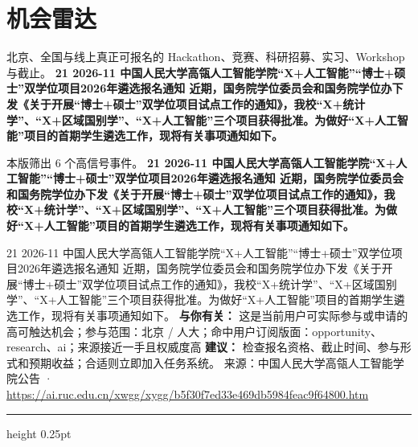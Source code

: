 \documentclass[10.5pt]{ctexart}
\begin{document}
\section*{机会雷达}
{\color{ormuted} 北京、全国与线上真正可报名的 Hackathon、竞赛、科研招募、实习、Workshop 与截止。}
\vspace{2mm}
{\LARGE\bfseries 21 2026-11 中国人民大学高瓴人工智能学院“X+人工智能”“博士+硕士”双学位项目2026年遴选报名通知 近期，国务院学位委员会和国务院学位办下发《关于开展“博士+硕士”双学位项目试点工作的通知》，我校“X+统计学”、“X+区域国别学”、“X+人工智能”三个项目获得批准。为做好“X+人工智能”项目的首期学生遴选工作，现将有关事项通知如下。}\par
\vspace{1mm}
{\color{ormuted} 本版筛出 6 个高信号事件。}
\vspace{3mm}
{\Large\bfseries 21 2026-11 中国人民大学高瓴人工智能学院“X+人工智能”“博士+硕士”双学位项目2026年遴选报名通知 近期，国务院学位委员会和国务院学位办下发《关于开展“博士+硕士”双学位项目试点工作的通知》，我校“X+统计学”、“X+区域国别学”、“X+人工智能”三个项目获得批准。为做好“X+人工智能”项目的首期学生遴选工作，现将有关事项通知如下。}\par
21 2026-11 中国人民大学高瓴人工智能学院“X+人工智能”“博士+硕士”双学位项目2026年遴选报名通知 近期，国务院学位委员会和国务院学位办下发《关于开展“博士+硕士”双学位项目试点工作的通知》，我校“X+统计学”、“X+区域国别学”、“X+人工智能”三个项目获得批准。为做好“X+人工智能”项目的首期学生遴选工作，现将有关事项通知如下。
\textbf{与你有关：} 这是当前用户可实际参与或申请的高可触达机会；参与范围：北京 / 人大；命中用户订阅版面：opportunity、research、ai；来源接近一手且权威度高
\textbf{建议：} 检查报名资格、截止时间、参与形式和预期收益；合适则立即加入任务系统。
{\footnotesize\color{ormuted} 来源：中国人民大学高瓴人工智能学院公告 · \url{https://ai.ruc.edu.cn/xwgg/xygg/b5f30f7ed33e469db5984feac9f64800.htm}}
\vspace{4mm}
\hrule height 0.25pt
\vspace{3mm}
\end{document}
